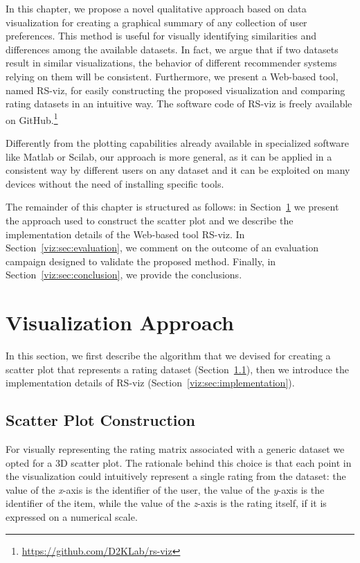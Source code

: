 In this chapter, we propose a novel qualitative approach based on data visualization for creating a graphical summary of any collection of user preferences. This method is useful for visually identifying similarities and differences among the available datasets. In fact, we argue that if two datasets result in similar visualizations, the behavior of different recommender systems relying on them will be consistent. Furthermore, we present a Web-based tool, named RS-viz, for easily constructing the proposed visualization and comparing rating datasets in an intuitive way. The software code of RS-viz is freely available on GitHub.\footnote{\url{https://github.com/D2KLab/rs-viz}}

Differently from the plotting capabilities already available in specialized software like Matlab or Scilab, our approach is more general, as it can be applied in a consistent way by different users on any dataset and it can be exploited on many devices without the need of installing specific tools.

The remainder of this chapter is structured as follows: in Section~\ref{viz:sec:visualization} we present the approach used to construct the scatter plot and we describe the implementation details of the Web-based tool RS-viz. In Section~\ref{viz:sec:evaluation}, we comment on the outcome of an evaluation campaign designed to validate the proposed method. Finally, in Section~\ref{viz:sec:conclusion}, we provide the conclusions.

\section{Visualization Approach}
\label{viz:sec:visualization}

In this section, we first describe the algorithm that we devised for creating a scatter plot that represents a rating dataset (Section~\ref{viz:sec:scatter}), then we introduce the implementation details of RS-viz (Section~\ref{viz:sec:implementation}).

\subsection{Scatter Plot Construction}
\label{viz:sec:scatter}

For visually representing the rating matrix associated with a generic dataset we opted for a 3D scatter plot. The rationale behind this choice is that each point in the visualization could intuitively represent a single rating from the dataset: the value of the \textit{x}-axis is the identifier of the user, the value of the \textit{y}-axis is the identifier of the item, while the value of the \textit{z}-axis is the rating itself, if it is expressed on a numerical scale.

